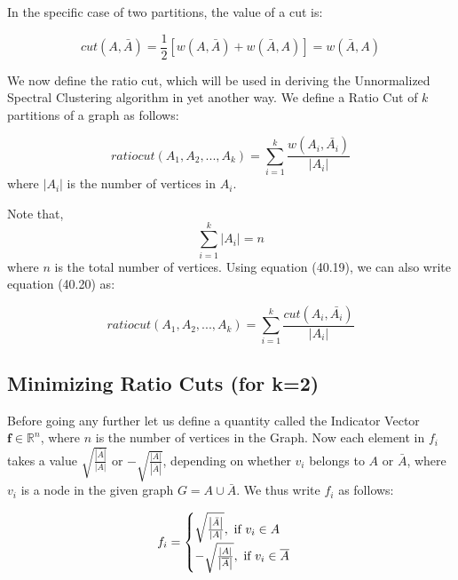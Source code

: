 \documentclass[english]{article}
\theoremstyle{plain}
\begin{document}
In the specific case of two partitions, the value of a cut is:

\begin{equation}
cut(A,\bar{A}) = \frac{1}{2} \left[w\left( A,\bar{A} \right) + w\left( \bar{A},A \right) \right] = w\left( \bar{A},A \right)  
\end{equation}

We now define the ratio cut, which will be used in deriving the Unnormalized Spectral Clustering algorithm in yet another way. 
We define a Ratio Cut of $k$ partitions of a graph as follows:

\begin{equation}
ratio cut(A_{1},A_{2},...,A_{k}) =  \sum_{i=1}^{k} \frac{w\left( A_{i},\bar{A_{i}} \right) }{\left|A_{i}\right|} 
\end{equation}
where $\left|A_{i}\right|$ is the number of vertices in $A_{i}$. 

Note that, \begin{equation}
\sum_{i=1}^{k} \left|A_{i} \right| = n
\end{equation}
where $n$ is the total number of vertices.
Using equation (40.19), we can also write equation (40.20) as:


\begin{equation}
ratio cut(A_{1},A_{2},...,A_{k}) =  \sum_{i=1}^{k} \frac{cut\left( A_{i},\bar{A_{i}} \right) }{\left|A_{i}\right|} 
\end{equation}

\subsection{Minimizing Ratio Cuts (for k=2)}

Before going any further let us define a quantity called the Indicator Vector $\boldsymbol{f} \in \mathbb{R}^{n}$, where $n$ is the number of vertices in the Graph. Now each element in $f_{i}$ takes a value $\sqrt{\frac{\left| \bar{A} \right|}{\left| A \right|}}$ or $-\sqrt{\frac{\left| A \right|}{\left| \overline{A} \right|}}$, depending on whether $v_{i}$ belongs to $A$ or $\bar{A}$, where $v_{i}$ is a node in the given graph $G = A \cup \bar{A}$. We thus write $f_{i}$ as follows:

\begin{equation}
f_{i} = 
\begin{cases}
\sqrt{\frac{\left| \bar{A} \right|}{\left| A \right|}}, \textnormal{ if } v_{i} \in A \\
-\sqrt{\frac{\left| A \right|}{\left| \overline{A} \right|}}, \textnormal{ if } v_{i} \in \overline{A}
\end{cases}
\end{equation}
\end{document}
